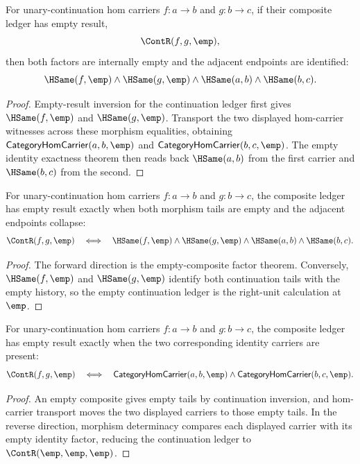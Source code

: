 \begin{theorem}
\label{thm:category-hom-carrier-empty-composite-factors}
For unary-continuation hom carriers $f:a\to b$ and $g:b\to c$, if their
composite ledger has empty result,
$$
\ContR(f,g,\emp),
$$
then both factors are internally empty and the adjacent endpoints are
identified:
$$
\HSame(f,\emp)\wedge\HSame(g,\emp)\wedge\HSame(a,b)\wedge\HSame(b,c).
$$
\end{theorem}
\begin{proof}
Empty-result inversion for the continuation ledger first gives
$\HSame(f,\emp)$ and $\HSame(g,\emp)$. Transport the two displayed hom-carrier
witnesses across these morphism equalities, obtaining
$\mathsf{CategoryHomCarrier}(a,b,\emp)$ and
$\mathsf{CategoryHomCarrier}(b,c,\emp)$. The empty identity exactness theorem
then reads back $\HSame(a,b)$ from the first carrier and $\HSame(b,c)$ from
the second.
\end{proof}

\begin{theorem}
\label{thm:category-hom-carrier-empty-composite-iff}
For unary-continuation hom carriers $f:a\to b$ and $g:b\to c$, the composite
ledger has empty result exactly when both morphism tails are empty and the
adjacent endpoints collapse:
$$
\ContR(f,g,\emp)
\quad\Longleftrightarrow\quad
\HSame(f,\emp)\wedge\HSame(g,\emp)\wedge\HSame(a,b)\wedge\HSame(b,c).
$$
\end{theorem}
\begin{proof}
The forward direction is the empty-composite factor theorem. Conversely,
$\HSame(f,\emp)$ and $\HSame(g,\emp)$ identify both continuation tails with
the empty history, so the empty continuation ledger is the right-unit
calculation at $\emp$.
\end{proof}



\begin{theorem}
\label{thm:category-hom-carrier-empty-composite-identity-factors}
For unary-continuation hom carriers $f:a\to b$ and $g:b\to c$, the composite
ledger has empty result exactly when the two corresponding identity carriers
are present:
$$
\ContR(f,g,\emp)
\quad\Longleftrightarrow\quad
\mathsf{CategoryHomCarrier}(a,b,\emp)\wedge
\mathsf{CategoryHomCarrier}(b,c,\emp).
$$
\end{theorem}
\begin{proof}
An empty composite gives empty tails by continuation inversion, and hom-carrier
transport moves the two displayed carriers to those empty tails. In the reverse
direction, morphism determinacy compares each displayed carrier with its empty
identity factor, reducing the continuation ledger to $\ContR(\emp,\emp,\emp)$.
\end{proof}

